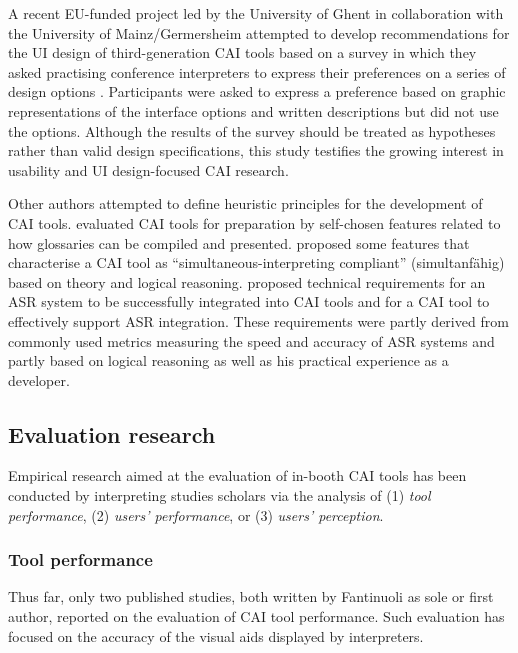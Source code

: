 A recent EU-funded project led by the University of Ghent in collaboration with the University of Mainz/Germersheim attempted to develop recommendations for the UI design of third-generation CAI tools based on a survey in which they asked practising conference interpreters to express their preferences on a series of design options \citep{eabm2021b}. Participants were asked to express a preference based on graphic representations of the interface options and written descriptions but did not use the options.  Although the results of the survey should be treated as hypotheses rather than valid design specifications, this study testifies the growing interest in usability and UI design-focused CAI research.

Other authors attempted to define heuristic principles for the development of CAI tools. \citet{costa2014comparative} evaluated CAI tools for preparation by self-chosen features related to how glossaries can be compiled and presented. \citet{will2015eignung} proposed some features that characterise a CAI tool as ``simultaneous-interpreting compliant'' (simultanfähig) based on theory and logical reasoning. \citet{fantinuoli2017speech} proposed technical requirements for an ASR system to be successfully integrated into CAI tools and for a CAI tool to effectively support ASR integration. These requirements were partly derived from commonly used metrics measuring the speed and accuracy of ASR systems and partly based on logical reasoning as well as his practical experience as a developer.

\subsection{Evaluation research}

Empirical research aimed at the evaluation of in-booth CAI tools has been conducted by interpreting studies scholars via the analysis of (1) \textit{tool performance}, (2) \textit{users’ performance}, or (3) \textit{users’ perception}.

\subsubsection{Tool performance}

Thus far, only two published studies, both written by Fantinuoli as sole or first author, reported on the evaluation of CAI tool performance. Such evaluation has focused on the accuracy of the visual aids displayed by interpreters.

